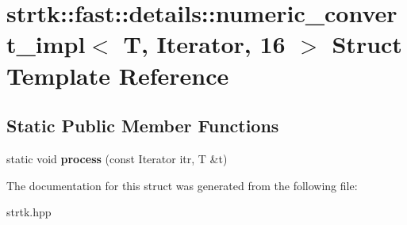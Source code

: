 \hypertarget{structstrtk_1_1fast_1_1details_1_1numeric__convert__impl_3_01T_00_01Iterator_00_0116_01_4}{\section{strtk\-:\-:fast\-:\-:details\-:\-:numeric\-\_\-convert\-\_\-impl$<$ T, Iterator, 16 $>$ Struct Template Reference}
\label{structstrtk_1_1fast_1_1details_1_1numeric__convert__impl_3_01T_00_01Iterator_00_0116_01_4}
}
\subsection*{Static Public Member Functions}
\begin{DoxyCompactItemize}
\item 
\hypertarget{structstrtk_1_1fast_1_1details_1_1numeric__convert__impl_3_01T_00_01Iterator_00_0116_01_4_a0b70ff6240892acc29e729c6db702871}{static void {\bfseries process} (const Iterator itr, T \&t)}\label{structstrtk_1_1fast_1_1details_1_1numeric__convert__impl_3_01T_00_01Iterator_00_0116_01_4_a0b70ff6240892acc29e729c6db702871}

\end{DoxyCompactItemize}


The documentation for this struct was generated from the following file\-:\begin{DoxyCompactItemize}
\item 
strtk.\-hpp\end{DoxyCompactItemize}
